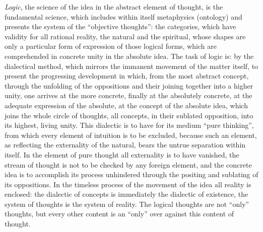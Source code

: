 \emph{Logic}, the science of the idea in the abstract element of
thought, is the fundamental science, which includes within itself
metaphysics (ontology) and presents the system of the ``objective
thoughts'': the categories, which have validity for all
rational reality, the natural and the spiritual, whose shapes are only a
particular form of expression of those logical forms, which are
comprehended in concrete unity in the absolute idea. The task of logic
is: by the dialectical method, which mirrors the immanent movement of
the matter itself, to present the progressing development in which, from
the most abstract concept, through the unfolding of the oppositions and
their joining together into a higher unity, one arrives at the more
concrete, finally at the absolutely concrete, at the adequate expression
of the absolute, at the concept of the absolute idea, which joins the
whole circle of thoughts, all concepts, in their sublated opposition,
into its highest, living unity. This dialectic is to have for its medium
``pure thinking'', from which every element of intuition is to be
excluded, because such an element, as reflecting the externality of the
natural, bears the untrue separation within itself. In the element of
pure thought all externality is to have vanished, the stream of thought
is not to be checked by any foreign element, and the concrete idea is to
accomplish its process unhindered through the positing and sublating of
its oppositions. In the timeless process of the movement of the idea all
reality is enclosed: the dialectic of concepts is immediately the
dialectic of existence, the system of thoughts is the system of reality.
The logical thoughts are not ``only'' thoughts, but every other content
is an ``only'' over against this content of thought.

